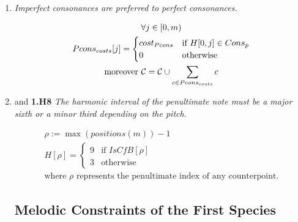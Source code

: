\begin{enumerate}[wide, label=\bfseries 1.H\arabic*]
\item{\textit{Imperfect consonances are preferred to perfect consonances.}}


\begin{equation}
    \begin{gathered}
        \forall j \in [0, m)\\
        Pcons_{costs}[j] = \begin{cases}
            cost_{Pcons} & \text{if } H[0, j] \in Cons_{p}\\
            0 & \text{otherwise}
        \end{cases}\\
        \text{moreover } \mathcal{C} = \mathcal{C} \cup \sum _{c \in Pcons_{costs}} c
    \end{gathered}
\end{equation}

\item{and \textbf{1.H8} \textit{The harmonic interval of the penultimate note must be a major sixth or a minor third depending on the \cfs pitch.}}\label{rule:penult-interval-2v}
\addtocounter{enumi}{1} 
\begin{equation}
    \begin{gathered}
        \rho := \max (positions(m)) - 1\\
        H[\rho] = \begin{cases}
            9 & \text{if } IsCfB[\rho]\\
            3 & \text{otherwise}
        \end{cases}\\
        \text{where } \rho \text{ represents the penultimate index of any counterpoint.}
    \end{gathered}
\end{equation}

\subsection*{Melodic Constraints of the First Species}
\end{enumerate}

